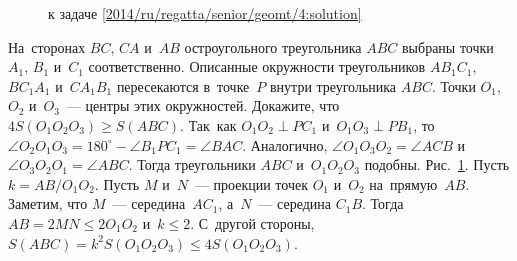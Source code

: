 \ifsolution
\begin{figure}\centering
    \caption{к задаче \ref{2014/ru/regatta/senior/geomt/4:solution}}
    \label{2014/ru/regatta/senior/geomt/4:solution:fig}
\end{figure}%
\fi %

\problem
На~сторонах $BC$, $CA$ и~$AB$ остроугольного треугольника $ABC$ выбраны
точки $A_1$, $B_1$ и~$C_1$ соответственно.
Описанные окружности треугольников  $A B_1 C_1$, $B C_1 A_1$ и~$C A_1 B_1$
пересекаются в~точке~$P$ внутри треугольника $ABC$.
Точки $O_1$, $O_2$ и~$O_3$~--- центры этих окружностей.
Докажите, что $4 S(O_1 O_2 O_3) \geq S(ABC)$.
\solution\label{2014/ru/regatta/senior/geomt/4:solution}
Так~как $O_1 O_2 \perp P C_1$ и~$O_1 O_3 \perp P B_1$,
то~$\angle O_2 O_1 O_3 = 180^\circ - \angle B_1 P C_1 = \angle BAC$. 
Аналогично,
$\angle O_1 O_3 O_2 = \angle ACB$ и~$\angle O_3 O_2 O_1 = \angle ABC$. 
Тогда треугольники $ABC$ и~$O_1 O_2 O_3$ подобны.
Рис.~\ref{2014/ru/regatta/senior/geomt/4:solution:fig}.
Пусть $k = AB / O_1 O_2$. 
Пусть $M$ и~$N$~--- проекции точек $O_1$ и~$O_2$ на~прямую~$AB$.
Заметим, что $M$~--- середина~$A C_1$, а~$N$~--- середина $C_1B$. 
Тогда $AB = 2 MN \leq 2 O_1 O_2$ и~$k \leq 2$. 
С~другой стороны, $S(ABC) = k^2 S(O_1 O_2 O_3) \leq 4 S(O_1 O_2 O_3)$. 
\endproblem
